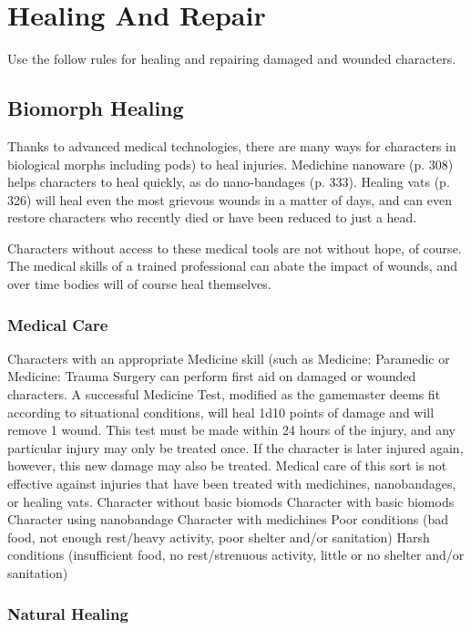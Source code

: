 \section{Healing And Repair}

Use the follow rules for healing and repairing damaged
and wounded characters.

\subsection{Biomorph Healing}

Thanks to advanced medical technologies, there are 
many ways for characters in biological morphs including
pods) to heal injuries. Medichine nanoware
(p. 308) helps characters to heal quickly, as do nano-bandages
(p. 333). Healing vats (p. 326) will heal even
the most grievous wounds in a matter of days, and 
can even restore characters who recently died or have 
been reduced to just a head.

Characters without access to these medical tools are 
not without hope, of course. The medical skills of a 
trained professional can abate the impact of wounds, 
and over time bodies will of course heal themselves.

\subsubsection{Medical Care}

Characters with an appropriate Medicine skill (such 
as Medicine: Paramedic or Medicine: Trauma Surgery
can perform first aid on damaged or wounded
characters. A successful Medicine Test, modified as 
the gamemaster deems fit according to situational 
conditions, will heal 1d10 points of damage and will 
remove 1 wound. This test must be made within 24 
hours of the injury, and any particular injury may only 
be treated once. If the character is later injured again, 
however, this new damage may also be treated. Medical
care of this sort is not effective against injuries that
have been treated with medichines, nanobandages, or 
healing vats.
Character without basic biomods
Character with basic biomods
Character using nanobandage
Character with medichines
Poor conditions (bad food, not enough rest/heavy activity, 
poor shelter and/or sanitation)
Harsh conditions (insufficient food, no rest/strenuous activity, 
little or no shelter and/or sanitation)

\subsubsection{Natural Healing}

